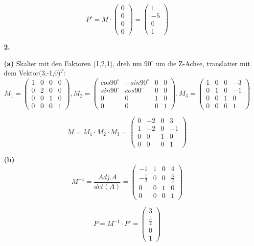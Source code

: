 \documentclass[fleqn]{article}
\begin{document}
$$P' = M\cdot \begin{pmatrix} 0 \\ 0 \\ 0 \\ 0 \end{pmatrix} = \begin{pmatrix} 1 \\ -5 \\ 0 \\ 1 \end{pmatrix}$$

\indent\textbf{2.}

\indent\indent\textbf{(a)} Skalier mit den Faktoren (1,2,1), dreh um $90^{\circ}$ um die Z-Achse, translatier mit dem Vektor(3,-1,0)$^T$:  
$$M_1 = \begin{pmatrix} 1 & 0 & 0 & 0 \\ 0 &2&0&0\\ 0&0&1&0 \\ 0&0&0&1 \end{pmatrix}, M_2 = \begin{pmatrix} cos90^{\circ} & -sin90^{\circ} & 0 & 0 \\ sin90^{\circ} &cos90^{\circ}&0&0\\ 0&0&1&0 \\ 0&0&0&1 \end{pmatrix}, M_3 = \begin{pmatrix} 1 & 0 & 0 & -3 \\ 0 &1&0&-1\\ 0&0&1&0 \\ 0&0&0&1 \end{pmatrix}$$

$$M = M_1 \cdot M_2 \cdot M_3 = \begin{pmatrix} 0 & -2 & 0 & 3 \\ 1 &-2&0&-1\\ 0&0&1&0 \\ 0&0&0&1 \end{pmatrix}$$

\indent\indent\textbf{(b)}
$$M^{-1} = \frac{Adj.A}{det(A)} = \begin{pmatrix} -1 & 1 & 0 & 4 \\ -\frac{1}{2} &0&0&\frac{3}{2}\\ 0&0&1&0 \\ 0&0&0&1 \end{pmatrix}$$ 

$$P = M^{-1}\cdot P' = \begin{pmatrix} 3 \\ \frac{5}{2} \\ 0 \\ 1 \end{pmatrix}$$
\end{document}
